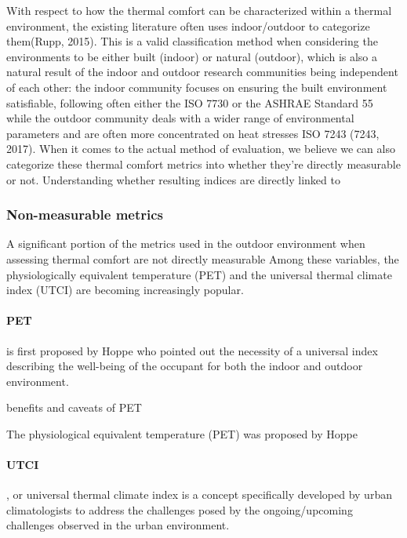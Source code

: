 With respect to how the thermal comfort can be characterized within a thermal environment, the existing literature often uses indoor/outdoor to categorize them(Rupp, 2015). This is a valid classification method when considering the environments to be either built (indoor) or natural (outdoor), which is also a natural result of the indoor and outdoor research communities being independent of each other: the indoor community focuses on ensuring the built environment satisfiable, following often either the ISO 7730 \cite{iso_iso_2005} or the ASHRAE Standard 55 \cite{ansi/ashrae_standard_2017} while the outdoor community deals with a wider range of environmental parameters and are often more concentrated on heat stresses ISO 7243 (7243, 2017). When it comes to the actual method of evaluation, we believe we can also categorize these thermal comfort metrics into whether they're directly measurable or not. Understanding whether resulting indices are directly linked to 

\subsubsection{Non-measurable metrics}
    A significant portion of the metrics used in the outdoor environment when assessing thermal comfort are not directly measurable
    Among these variables, the physiologically equivalent temperature (PET) and the universal thermal climate index (UTCI) are becoming increasingly popular.
    \paragraph{PET} is first proposed by Hoppe who pointed out the necessity of a universal index describing the well-being of the occupant for both the indoor and outdoor environment. 
    
    benefits and caveats of PET
    

    The physiological equivalent temperature (PET) was proposed by Hoppe\cite{h._hoppe_new_1992}   
    \paragraph{UTCI}, or universal thermal climate index is a concept specifically developed by urban climatologists to address the challenges posed by the ongoing/upcoming challenges observed in the urban environment.
    
